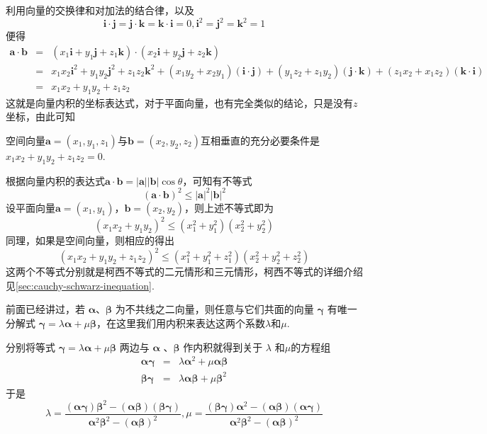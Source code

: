 利用向量的交换律和对加法的结合律，以及
\[ \bm{i} \cdot \bm{j} = \bm{j} \cdot \bm{k} = \bm{k} \cdot \bm{i} = 0, \bm{i}^2 = \bm{j}^2 = \bm{k}^2=1 \]
便得
\begin{eqnarray*}
  \bm{a} \cdot \bm{b} & = & (x_1 \bm{i} + y_1 \bm{j} + z_1 \bm{k}) \cdot (x_2 \bm{i} + y_2 \bm{j} + z_2 \bm{k}) \\
                      & = & x_1x_2 \bm{i}^2 + y_1y_2 \bm{j}^2 + z_1z_2 \bm{k}^2 + (x_1y_2+x_2y_1)(\bm{i} \cdot \bm{j}) + (y_1z_2+z_1y_2)(\bm{j} \cdot \bm{k}) + (z_1x_2 + x_1z_2)(\bm{k} \cdot \bm{i}) \\
  & = & x_1x_2 + y_1y_2+z_1z_2
\end{eqnarray*}
这就是向量内积的坐标表达式，对于平面向量，也有完全类似的结论，只是没有$z$坐标，由此可知

\begin{theorem}
  空间向量$\bm{a}=(x_1,y_1,z_1)$与$\bm{b} = (x_2,y_2,z_2)$互相垂直的充分必要条件是$x_1x_2+y_1y_2+z_1z_2=0$.
\end{theorem}

根据向量内积的表达式$\bm{a}\cdot\bm{b}=|\bm{a}||\bm{b}|\cos{\theta}$，可知有不等式
\[ (\bm{a}\cdot\bm{b})^2 \leqslant |\bm{a}|^2 |\bm{b}|^2 \]
设平面向量$\bm{a}=(x_1,y_1)$，$\bm{b}=(x_2,y_2)$，则上述不等式即为
\[ (x_1x_2+y_1y_2)^2 \leqslant (x_1^2+y_1^2)(x_2^2+y_2^2) \]
同理，如果是空间向量，则相应的得出
\[ (x_1x_2+y_1y_2+z_1z_2)^2 \leqslant (x_1^2+y_1^2+z_1^2)(x_2^2+y_2^2+z_2^2) \]
这两个不等式分别就是柯西不等式的二元情形和三元情形，柯西不等式的详细介绍见\autoref{sec:cauchy-schwarz-inequation}.

\begin{example}[用内积表达向量分解系数]
  前面已经讲过，若 $\bm \alpha$、$\bm \beta$ 为不共线之二向量，则任意与它们共面的向量 $\bm \gamma $ 有唯一分解式 $\bm \gamma = \lambda \bm \alpha + \mu \bm \beta$，在这里我们用内积来表达这两个系数$\lambda$和$\mu$.

  分别将等式 $\bm \gamma = \lambda \bm \alpha + \mu \bm \beta$ 两边与 $\bm \alpha$ 、$\bm \beta$ 作内积就得到关于 $\lambda$ 和$\mu$的方程组
\begin{eqnarray*}
  \bm \alpha \bm \gamma  & = & \lambda \bm \alpha^2 + \mu \bm \alpha \bm \beta \\
  \bm \beta \bm \gamma  & = & \lambda \bm \alpha \bm \beta + \mu \bm \beta^2 
\end{eqnarray*}
于是
\[ \lambda = \frac{(\bm \alpha \bm \gamma)\bm\beta^{2}-(\bm \alpha \bm \beta)(\bm \beta \bm \gamma)}{\bm \alpha^2 \bm \beta^2-(\bm \alpha \bm \beta)^2},
  \mu = \frac{(\bm \beta \bm \gamma)\bm \alpha^2-(\bm \alpha \bm \beta)(\bm \alpha \bm \gamma)}{\bm \alpha^2 \bm \beta^2-(\bm \alpha \bm \beta)^2} \]
\end{example}

